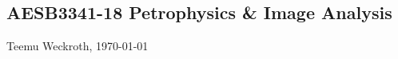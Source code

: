 \documentclass[10pt,landscape,a4paper]{article}
\begin{document}
\raggedright
\footnotesize
\begin{multicols}{3}
    \setlength{\premulticols}{1pt}
    \setlength{\postmulticols}{1pt}
    \setlength{\multicolsep}{1pt}
    \setlength{\columnsep}{2pt}

    \part*{AESB3341-18 Petrophysics \& Image Analysis}
    \begin{center}
        Teemu Weckroth, \today
    \end{center}

    

    \newpage
\end{multicols}
\end{document}
